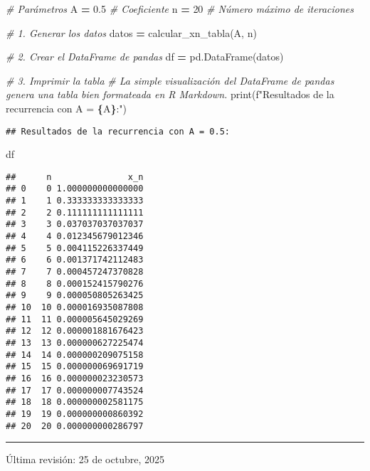 \documentclass[
]{article}
\newenvironment{Shaded}{\begin{snugshade}}{\end{snugshade}}
\newcommand{\BuiltInTok}[1]{#1}
\newcommand{\CommentTok}[1]{\textcolor[rgb]{0.56,0.35,0.01}{\textit{#1}}}
\newcommand{\DecValTok}[1]{\textcolor[rgb]{0.00,0.00,0.81}{#1}}
\newcommand{\FloatTok}[1]{\textcolor[rgb]{0.00,0.00,0.81}{#1}}
\newcommand{\NormalTok}[1]{#1}
\newcommand{\OperatorTok}[1]{\textcolor[rgb]{0.81,0.36,0.00}{\textbf{#1}}}
\newcommand{\SpecialCharTok}[1]{\textcolor[rgb]{0.81,0.36,0.00}{\textbf{#1}}}
\newcommand{\SpecialStringTok}[1]{\textcolor[rgb]{0.31,0.60,0.02}{#1}}
\begin{document}
\begin{Shaded}
\begin{Highlighting}[]
\CommentTok{\# Parámetros}
\NormalTok{A }\OperatorTok{=} \FloatTok{0.5}  \CommentTok{\# Coeficiente}
\NormalTok{n }\OperatorTok{=} \DecValTok{20}   \CommentTok{\# Número máximo de iteraciones}

\CommentTok{\# 1. Generar los datos}
\NormalTok{datos }\OperatorTok{=}\NormalTok{ calcular\_xn\_tabla(A, n)}

\CommentTok{\# 2. Crear el DataFrame de pandas}
\NormalTok{df }\OperatorTok{=}\NormalTok{ pd.DataFrame(datos)}

\CommentTok{\# 3. Imprimir la tabla}
\CommentTok{\# La simple visualización del DataFrame de pandas genera una tabla bien formateada en R Markdown.}
\BuiltInTok{print}\NormalTok{(}\SpecialStringTok{f"Resultados de la recurrencia con A = }\SpecialCharTok{\{}\NormalTok{A}\SpecialCharTok{\}}\SpecialStringTok{:"}\NormalTok{)}
\end{Highlighting}
\end{Shaded}

\begin{verbatim}
## Resultados de la recurrencia con A = 0.5:
\end{verbatim}

\begin{Shaded}
\begin{Highlighting}[]
\NormalTok{df}
\end{Highlighting}
\end{Shaded}

\begin{verbatim}
##      n               x_n
## 0    0 1.000000000000000
## 1    1 0.333333333333333
## 2    2 0.111111111111111
## 3    3 0.037037037037037
## 4    4 0.012345679012346
## 5    5 0.004115226337449
## 6    6 0.001371742112483
## 7    7 0.000457247370828
## 8    8 0.000152415790276
## 9    9 0.000050805263425
## 10  10 0.000016935087808
## 11  11 0.000005645029269
## 12  12 0.000001881676423
## 13  13 0.000000627225474
## 14  14 0.000000209075158
## 15  15 0.000000069691719
## 16  16 0.000000023230573
## 17  17 0.000000007743524
## 18  18 0.000000002581175
## 19  19 0.000000000860392
## 20  20 0.000000000286797
\end{verbatim}

\begin{center}\rule{0.5\linewidth}{0.5pt}\end{center}

Última revisión: 25 de octubre, 2025
\end{document}
